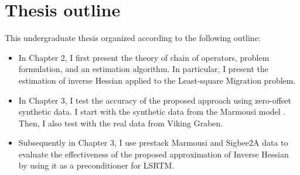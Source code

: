 \section{Thesis outline}

This undergraduate thesis organized according to the following outline:
 
\begin{itemize}

\item In Chapter 2, I first present the theory of chain of operators, problem formulation, and an estimation algorithm. In particular, I present the estimation of inverse Hessian applied to the Least-square Migration problem. 

\item In Chapter 3, I test the accuracy of the proposed approach using zero-offset synthetic data. I start with the synthetic data from the Marmousi model \cite[]{versteeg1994}. Then, I also test with the real data from Viking Graben. 

\item Subsequently in Chapter 3, I use prestack Marmousi and Sigbee2A data to evaluate the effectiveness of the proposed approximation of Inverse Hessian by using it as a preconditioner for LSRTM.
\end{itemize}
